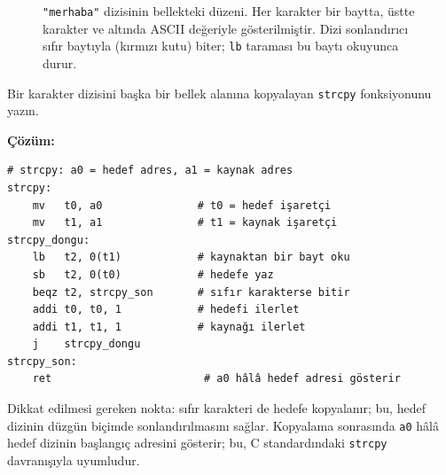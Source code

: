 \begin{figure}[htbp]
\centering
{}
\caption[Karakter dizisinin bellekteki düzeni]{\texttt{"merhaba"} dizisinin bellekteki düzeni. Her karakter bir baytta, üstte karakter ve altında ASCII değeriyle gösterilmiştir. Dizi sonlandırıcı sıfır baytıyla (kırmızı kutu) biter; \texttt{lb} taraması bu baytı okuyunca durur.}
\label{fig:dizgi-bellek}
\end{figure}

\begin{ornek}[4.10]
\label{orn:strcpy}
Bir karakter dizisini başka bir bellek alanına kopyalayan \texttt{strcpy} fonksiyonunu yazın.

\textbf{Çözüm:}

\begin{lstlisting}[style=riscv]
# strcpy: a0 = hedef adres, a1 = kaynak adres
strcpy:
    mv   t0, a0               # t0 = hedef işaretçi
    mv   t1, a1               # t1 = kaynak işaretçi
strcpy_dongu:
    lb   t2, 0(t1)            # kaynaktan bir bayt oku
    sb   t2, 0(t0)            # hedefe yaz
    beqz t2, strcpy_son       # sıfır karakterse bitir
    addi t0, t0, 1            # hedefi ilerlet
    addi t1, t1, 1            # kaynağı ilerlet
    j    strcpy_dongu
strcpy_son:
    ret                        # a0 hâlâ hedef adresi gösterir
\end{lstlisting}

Dikkat edilmesi gereken nokta: sıfır karakteri de hedefe kopyalanır; bu, hedef dizinin düzgün biçimde sonlandırılmasını sağlar. Kopyalama sonrasında \texttt{a0} hâlâ hedef dizinin başlangıç adresini gösterir; bu, C standardındaki \texttt{strcpy} davranışıyla uyumludur.
\end{ornek}

